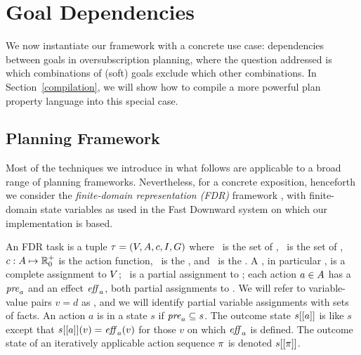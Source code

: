 \section{Goal Dependencies}
\label{goaldep}


We now instantiate our framework with a concrete use case:
dependencies between goals in oversubscription planning, where the
question addressed is which combinations of (soft) goals exclude which
other combinations. In Section~\ref{compilation}, we will show how to
compile a more powerful plan property language into this special case.




\subsection{Planning Framework}
\label{goaldep:planning}

Most of the techniques we introduce in what follows are applicable to
a broad range of planning frameworks. Nevertheless, for a concrete
exposition, henceforth we consider the \emph{finite-domain
  representation (FDR)} framework
\cite{backstrom:nebel:ci-95,helmert:ai-09}, with finite-domain state
variables as used in the Fast Downward system \cite{helmert:jair-06}
on which our implementation is based.

An FDR task  is a tuple $\tau =
(V,A,{c},I,G)$ where \vars\ is the set of
, \acts\ is the set of , ${c}:
A \mapsto {\mathbb{R}}^+_0$ is the action  function,
\init\ is the , and \goal\ is the
. A , in particular \init, is a complete
assignment to $V$; \goal\ is a partial assignment to \vars; each
action $a \in A$ has a  $\mathit{pre}_a$ and an
effect $\mathit{eff}_a$, both partial assignments to \vars. We will refer to
variable-value pairs $v=d$ as , and we will identify
partial variable assignments with sets of facts.
%
An action $a$ is  in a state $s$ if $\mathit{pre}_a
\subseteq s$. The outcome state $s[[a]]$ is like $s$ except that
$s[[a]](v) = \mathit{eff}_a(v)$ for those $v$ on which $\mathit{eff}_a$ is
defined. The outcome state of an iteratively applicable action
sequence $\pi$ is denoted $s[[\pi]]$.

